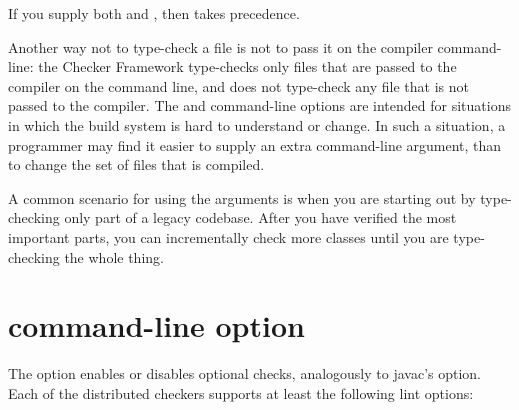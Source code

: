 If you supply both  and , then
 takes precedence.

Another way not to type-check a file is not to pass it on the compiler
command-line:  the Checker Framework type-checks only files that are passed
to the compiler on the command line, and does not type-check any file that
is not passed to the compiler.  The  and 
command-line options
are intended for situations in which the build system is hard to understand
or change.  In such a situation, a programmer may find it easier to supply
an extra command-line argument, than to change the set of files that is
compiled.

A common scenario for using the arguments is when you are starting out by
type-checking only part of a legacy codebase.  After you have verified the
most important parts, you can incrementally check more classes until you
are type-checking the whole thing.


\section{ command-line option\label{alint}}

\label{lint-options}

The  option enables or disables optional checks, analogously to
javac's  option.
Each of the distributed checkers supports at least the following lint options:




